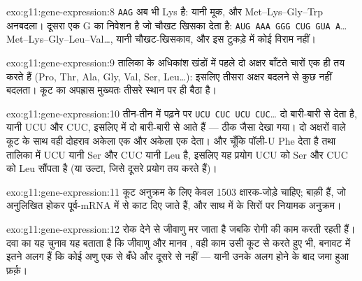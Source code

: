 \begin{solution}{exo:g11:gene-expression:8}
\texttt{AAG} अब भी Lys है: यानी मूक, और Met--Lys--Gly--Trp अनबदला। दूसरा
एक G का निवेशन है जो चौखट खिसका देता है: \texttt{AUG AAA GGG
CUG GUA A}\dots{} Met--Lys--Gly--Leu--Val\dots, यानी चौखट-खिसकाव, और इस
टुकड़े में कोई विराम नहीं।
\end{solution}

\begin{solution}{exo:g11:gene-expression:9}
तालिका के अधिकांश खंडों में पहले दो अक्षर बाँटते चारों  एक ही  तय करते हैं (Pro, Thr, Ala, Gly, Val, Ser, Leu\dots): इसलिए तीसरा
अक्षर बदलने से कुछ नहीं बदलता। कूट का अपह्रास मुख्यतः तीसरे स्थान पर ही
बैठा है।
\end{solution}

\begin{solution}{exo:g11:gene-expression:10}
तीन-तीन में पढ़ने पर \texttt{UCU CUC UCU CUC}\dots{} दो  बारी-बारी से
देता है, यानी UCU और CUC, इसलिए  में दो  बारी-बारी से आते
हैं --- ठीक जैसा देखा गया। दो अक्षरों वाले कूट के साथ वही दोहराव अकेला एक
 और अकेला एक  देता। और चूँकि पॉली-U Phe देता है तथा तालिका
में UCU यानी Ser और CUC यानी Leu है, इसलिए यह प्रयोग UCU को Ser और CUC को
Leu सौंपता है (या उल्टा, जिसे दूसरे प्रयोग तय करते हैं)।
\end{solution}

\begin{solution}{exo:g11:gene-expression:11}
कूट अनुक्रम के लिए केवल 1503 क्षारक-जोड़े चाहिए; बाक़ी  हैं, जो
अनुलिखित होकर पूर्व-mRNA में से काट दिए जाते हैं, और साथ में  के सिरों
पर नियामक अनुक्रम।
\end{solution}

\begin{solution}{exo:g11:gene-expression:12}
 रोक देने से जीवाणु मर जाता है जबकि रोगी की  काम करती रहती
हैं। दवा का यह चुनाव यह बताता है कि जीवाणु और मानव , वही काम उसी
कूट से करते हुए भी, बनावट में इतने अलग हैं कि कोई अणु एक से बँधे और दूसरे
से नहीं --- यानी उनके अलग होने के बाद जमा हुआ फ़र्क़।
\end{solution}


